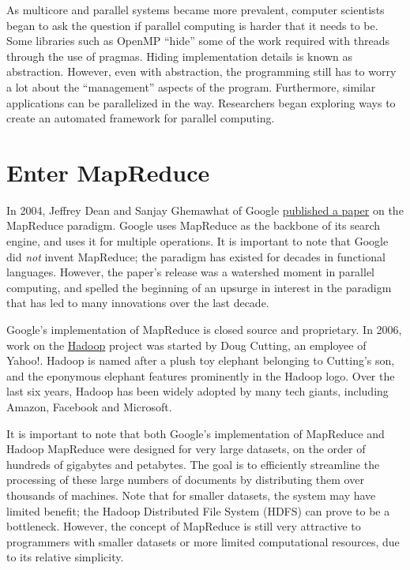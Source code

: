 \documentclass[letterpaper,10pt,openany,oneside]{sphinxmanual}
\begin{document}
As multicore and parallel systems became more prevalent, computer scientists
began to ask the question if parallel computing is harder that it needs to be.
Some libraries such as OpenMP ``hide'' some of the work required with threads
through the use of pragmas. Hiding implementation details is known as
abstraction. However, even with abstraction, the programming still has to worry
a lot about the ``management'' aspects of the program. Furthermore, similar
applications can be parallelized in the way. Researchers began exploring ways
to create an automated framework for parallel computing.


\section{Enter MapReduce}
\label{MRIntro/MRIntro:enter-mapreduce}
In 2004, Jeffrey Dean and Sanjay Ghemawhat of Google \href{http://static.usenix.org/publications/library/proceedings/osdi04/tech/full\_papers/dean/dean\_html/}{published a paper} on the
MapReduce paradigm. Google uses MapReduce as the backbone of its search engine,
and uses it for multiple operations. It is important to note that Google did
\emph{not} invent MapReduce; the paradigm has existed for decades in functional
languages. However, the paper's release was a watershed moment in parallel
computing, and spelled the beginning of an upsurge in interest in the paradigm
that has led to many innovations over the last decade.

Google's implementation of MapReduce is closed source and proprietary. In 2006,
work on the \href{http://hadoop.apache.org/}{Hadoop} project was started by Doug Cutting, an employee of Yahoo!.
Hadoop is named after a plush toy elephant belonging to Cutting's son, and the
eponymous elephant features prominently in the Hadoop logo. Over the last six
years, Hadoop has been widely adopted by many tech giants, including Amazon,
Facebook and Microsoft.

It is important to note that both Google's implementation of MapReduce and
Hadoop MapReduce were designed for very large datasets, on the order of
hundreds of gigabytes and petabytes. The goal is to efficiently streamline the
processing of these large numbers of documents by distributing them over
thousands of machines. Note that for smaller datasets, the system may have
limited benefit; the Hadoop Distributed File System (HDFS) can prove to be a
bottleneck. However, the concept of MapReduce is still very attractive to
programmers with smaller datasets or more limited computational resources, due
to its relative simplicity.
\end{document}
